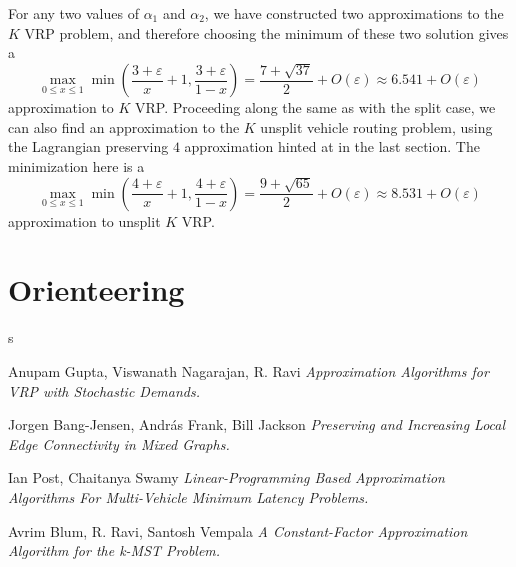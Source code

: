 \documentclass{article}
\theoremstyle{plain}
\theoremstyle{plain}
\begin{document}
For any two values of $\alpha_1$ and $\alpha_2$, we have constructed two approximations to the $K$ VRP problem, and therefore choosing the minimum of these two solution gives a
%
\[ \max_{0 \leq x \leq 1} \min \left( \frac{3 + \varepsilon}{x} + 1, \frac{3 + \varepsilon}{1 - x} \right) = \frac{7 + \sqrt{37}}{2} + O(\varepsilon) \approx 6.541 + O(\varepsilon) \]
%
approximation to $K$ VRP. Proceeding along the same as with the split case, we can also find an approximation to the $K$ unsplit vehicle routing problem, using the Lagrangian preserving $4$ approximation hinted at in the last section. The minimization here is a
%
\[ \max_{0 \leq x \leq 1} \min \left( \frac{4 + \varepsilon}{x} + 1, \frac{4 + \varepsilon}{1 - x} \right) = \frac{9 + \sqrt{65}}{2} + O(\varepsilon) \approx 8.531 + O(\varepsilon) \]
%
approximation to unsplit $K$ VRP.

\section{Orienteering}

s

\begin{thebibliography}{9}

Anupam Gupta, Viswanath Nagarajan, R. Ravi
\textit{Approximation Algorithms for VRP with Stochastic Demands.}

Jorgen Bang-Jensen, Andr\'{a}s Frank, Bill Jackson
\textit{Preserving and Increasing Local Edge Connectivity in Mixed Graphs.}

Ian Post, Chaitanya Swamy
\textit{Linear-Programming Based Approximation Algorithms For Multi-Vehicle Minimum Latency Problems.}

Avrim Blum, R. Ravi, Santosh Vempala
\textit{A Constant-Factor Approximation Algorithm for the k-MST Problem.}

\end{thebibliography}
\end{document}
